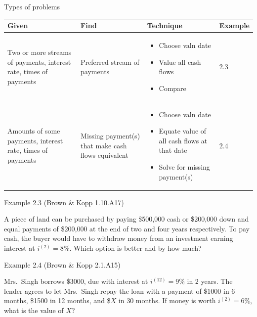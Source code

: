 \documentclass{beamer}
\begin{document}
\begin{frame}{Types of problems}

\footnotesize
\renewcommand{\arraystretch}{1.2}
\begin{tabular}{@{}>{\raggedright\arraybackslash}p{}>{\raggedright\arraybackslash}p{}p{}p{}@{}}
\toprule
\textbf{Given} & \textbf{Find} & \textbf{Technique} & \textbf{Example} \\
\midrule
Two or more streams of payments, interest rate, times of payments
& Preferred stream of payments
& \vspace{-2ex}\begin{itemize}
  \item Choose valn date
  \item Value all cash flows
  \item Compare
  \end{itemize}
& 2.3 \\
\midrule
Amounts of some payments, interest rate, times of payments
& Missing payment(s) that make cash flows equivalent
& \vspace{-2ex}\begin{itemize}
  \item Choose valn date
  \item Equate value of all cash flows at that date
  \item Solve for missing payment(s)
  \end{itemize}
& 2.4 \\
\bottomrule
\end{tabular}

\end{frame}

\begin{frame}{Example 2.3 (Brown \& Kopp 1.10.A17)}

A piece of land can be purchased by paying \$500,000 cash or \$200,000 down and equal payments of \$200,000 at the end of two and four years respectively. To pay cash, the buyer would have to withdraw money from an investment earning interest at $i^{(2)} = 8\%$. Which option is better and by how much?

\vfill
\end{frame}

\begin{frame}{Example 2.4 (Brown \& Kopp 2.1.A15)}

Mrs.\ Singh borrows \$3000, due with interest at $i^{(12)} = 9\%$ in 2 years. The lender agrees to let Mrs.\ Singh repay the loan with a payment of \$1000 in 6 months, \$1500 in 12 months, and \$$X$ in 30 months. If money is worth $i^{(2)} = 6\%$, what is the value of $X$?

\vfill
\end{frame}
\end{document}
